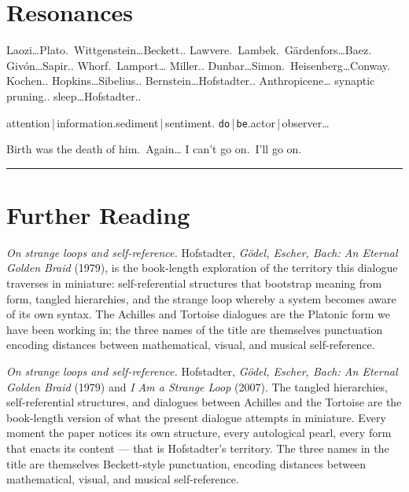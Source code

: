 \documentclass[11pt]{article}
\begin{document}
\section*{Resonances}

\begin{center}
\bigskip
{\small
Laozi\ldots Plato.\, Wittgenstein\ldots Beckett.. Lawvere.\, Lambek.\,
Gärdenfors\ldots Baez.\, Givón\ldots Sapir.. Whorf.\, Lamport\ldots
Miller.. Dunbar\ldots Simon.\, Heisenberg\ldots Conway.\, Kochen..
Hopkins\ldots Sibelius.. Bernstein\ldots Hofstadter.. Anthropicene\ldots
synaptic pruning.. sleep\ldots Hofstadter..

\medskip

attention\,|\,information.\quad sediment\,|\,sentiment.\quad
\texttt{do}\,|\,\texttt{be}.\quad actor\,|\,observer\ldots

\medskip

Birth was the death of him.\, Again\ldots\quad
I can't go on.\, I'll go on.
}
\bigskip
\end{center}

\bigskip\rule{\textwidth}{0.4pt}\bigskip


\section*{Further Reading}

\textit{On strange loops and self-reference.} Hofstadter,
\textit{Gödel, Escher, Bach: An Eternal Golden Braid} (1979),
is the book-length exploration of the territory this dialogue
traverses in miniature: self-referential structures that bootstrap
meaning from form, tangled hierarchies, and the strange loop whereby
a system becomes aware of its own syntax. The Achilles and Tortoise
dialogues are the Platonic form we have been working in; the three
names of the title are themselves punctuation encoding distances
between mathematical, visual, and musical self-reference.

\textit{On strange loops and self-reference.} Hofstadter,
\textit{Gödel, Escher, Bach: An Eternal Golden Braid} (1979) and
\textit{I Am a Strange Loop} (2007). The tangled hierarchies,
self-referential structures, and dialogues between Achilles and
the Tortoise are the book-length version of what the present
dialogue attempts in miniature. Every moment the paper notices
its own structure, every autological pearl, every form that enacts
its content --- that is Hofstadter's territory. The three names
in the title are themselves Beckett-style punctuation, encoding
distances between mathematical, visual, and musical self-reference.
\end{document}
